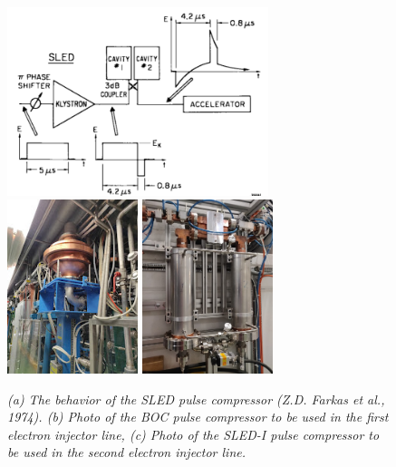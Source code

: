 \documentclass[12pt]{amsart}
\begin{document}
\begin{figure}[htbp] %
   \centering
   \includegraphics[width=3in]{im/boc.png} \\
   \includegraphics[width=1.5in]{im/Boc_Sband.jpg} 
   \includegraphics[width=1.5in]{im/Sled_Xband.jpg} 
   \caption{\em  (a) The behavior of the SLED pulse compressor (Z.D. Farkas et al., 1974).
   	(b) Photo of the BOC pulse compressor to be used in the first electron injector line,
	(c) Photo of the SLED-I pulse compressor to be used in the second electron injector line.    }
   \label{fig:pc}
\end{figure}

%
%
\end{document}
